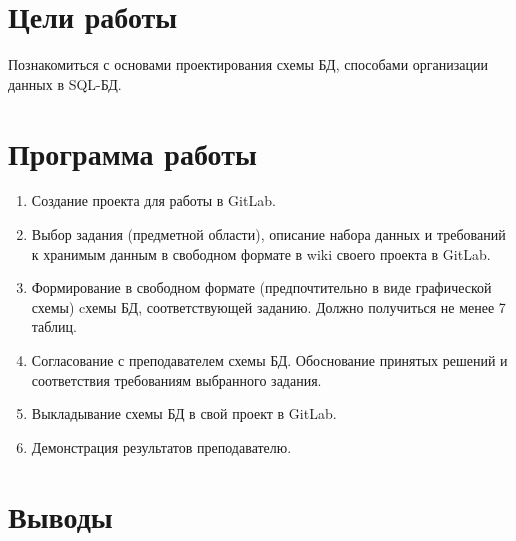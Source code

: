 





\tableofcontents
\newpage

\section{Цели работы}

Познакомиться с основами проектирования схемы БД, способами организации данных в SQL-БД. 

\section{Программа работы}

\begin{enumerate}
	\item Создание проекта для работы в GitLab.
	\item Выбор задания (предметной области), описание набора данных и требований к хранимым данным в свободном формате в wiki своего проекта в GitLab.
	\item Формирование в свободном формате (предпочтительно в виде графической схемы) cхемы БД, соответствующей заданию. Должно получиться не менее 7 таблиц.
	\item Согласование с преподавателем схемы БД. Обоснование принятых решений и соответствия требованиям выбранного задания. 
	\item Выкладывание схемы БД в свой проект в GitLab.
	\item Демонстрация результатов преподавателю.
\end{enumerate}

\section{Выводы}

